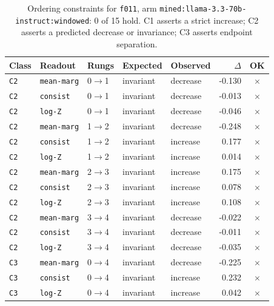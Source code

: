 \documentclass[11pt]{article}
\begin{document}
\begin{table}[htbp]
\centering
\small
\caption{Ordering constraints for \texttt{f011}, arm \texttt{mined:llama-3.3-70b-instruct:windowed}: 0 of 15 hold. C1 asserts a strict increase; C2 asserts a predicted decrease or invariance; C3 asserts endpoint separation.}
\label{tab:ladder-f011-mined-llama-3-3-70b-instruct-windowed}
\begin{tabular}{lllllrc}
\toprule
Class & Readout & Rungs & Expected & Observed & $\Delta$ & OK \\
\midrule
\texttt{C2} & \texttt{mean-marg} & 0$\to$1 & invariant & decrease & -0.130 & $\times$ \\
\texttt{C2} & \texttt{consist} & 0$\to$1 & invariant & decrease & -0.013 & $\times$ \\
\texttt{C2} & \texttt{log-Z} & 0$\to$1 & invariant & decrease & -0.046 & $\times$ \\
\texttt{C2} & \texttt{mean-marg} & 1$\to$2 & invariant & decrease & -0.248 & $\times$ \\
\texttt{C2} & \texttt{consist} & 1$\to$2 & invariant & increase & 0.177 & $\times$ \\
\texttt{C2} & \texttt{log-Z} & 1$\to$2 & invariant & increase & 0.014 & $\times$ \\
\texttt{C2} & \texttt{mean-marg} & 2$\to$3 & invariant & increase & 0.175 & $\times$ \\
\texttt{C2} & \texttt{consist} & 2$\to$3 & invariant & increase & 0.078 & $\times$ \\
\texttt{C2} & \texttt{log-Z} & 2$\to$3 & invariant & increase & 0.108 & $\times$ \\
\texttt{C2} & \texttt{mean-marg} & 3$\to$4 & invariant & decrease & -0.022 & $\times$ \\
\texttt{C2} & \texttt{consist} & 3$\to$4 & invariant & decrease & -0.011 & $\times$ \\
\texttt{C2} & \texttt{log-Z} & 3$\to$4 & invariant & decrease & -0.035 & $\times$ \\
\texttt{C3} & \texttt{mean-marg} & 0$\to$4 & invariant & decrease & -0.225 & $\times$ \\
\texttt{C3} & \texttt{consist} & 0$\to$4 & invariant & increase & 0.232 & $\times$ \\
\texttt{C3} & \texttt{log-Z} & 0$\to$4 & invariant & increase & 0.042 & $\times$ \\
\bottomrule
\end{tabular}
\end{table}
\end{document}
